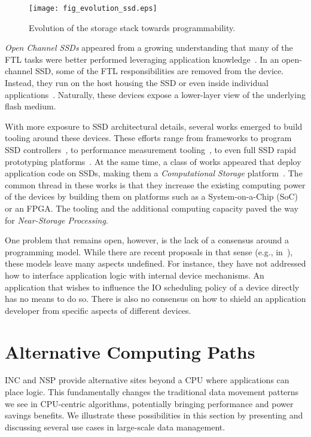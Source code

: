 \documentclass[11pt,dvipdfmx]{article}
\begin{document}
\begin{figure}[h]
  \centering
  \texttt{[image: fig\_evolution\_ssd.eps]} %
  \caption{Evolution of the storage stack towards programmability.}
  \label{fig:evolution_ssd}
\end{figure}

\emph{Open Channel SSDs} appeared from a growing understanding that many of the
FTL tasks were better performed leveraging application
knowledge~\cite{bjorling17}.
In an open-channel SSD, some of the FTL responsibilities are removed from the
device.
Instead, they run on the host housing the SSD or even inside individual
applications~\cite{ouyang14}.
Naturally, these devices expose a lower-layer view of the underlying flash
medium.


With more exposure to SSD architectural details, several works emerged to build
tooling around these devices.
These efforts range from frameworks to program SSD controllers~\cite{picoli20},
to performance measurement tooling~\cite{lerner20}, to even full SSD rapid
prototyping platforms~\cite{kwak20}.
At the same time, a class of works appeared that deploy application code on
SSDs, making them a \emph{Computational Storage} platform~\cite{picoli19, ruan19,
woods14}.
The common thread in these works is that they increase the existing computing
power of the devices by building them on platforms such as a System-on-a-Chip
(SoC) or an FPGA.
The tooling and the additional computing capacity paved the way for
\emph{Near-Storage Processing}.


One problem that remains open, however, is the lack of a consensus around a
programming model.
While there are recent proposals in that sense (e.g., in~\cite{gu16}), these
models leave many aspects undefined.
For instance, they have not addressed how to interface application logic with
internal device mechanisms.
An application that wishes to influence the IO scheduling policy of a device
directly has no means to do so.
There is also no consensus on how to shield an application developer from
specific aspects of different devices.


\section{Alternative Computing Paths}
\label{sec:data_paths}

INC and NSP  provide alternative sites beyond a CPU where applications can place
logic.
This fundamentally changes the traditional data movement patterns we see in
CPU-centric algorithms, potentially bringing performance and power savings
benefits.
We illustrate these possibilities in this section by presenting and discussing
several use cases in large-scale data management.
\end{document}
